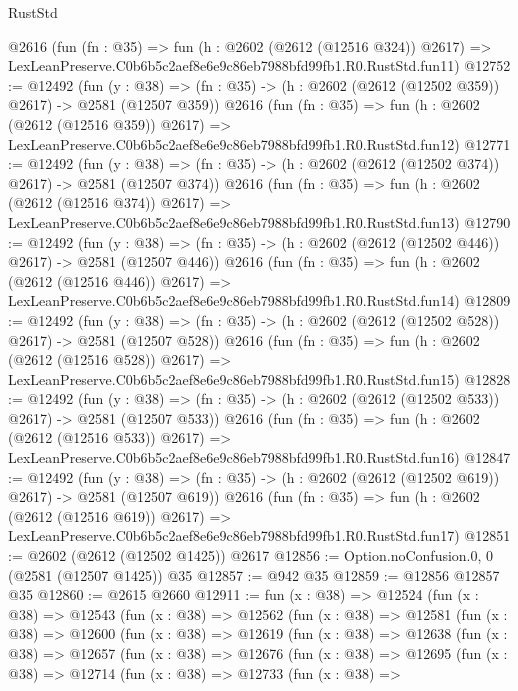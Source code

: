 \begin{lexlean}{RustStd}
\begin{coremodule}
    @2616
    (fun (fn : @35) =>
    fun (h : @2602 (@2612 (@12516 @324)) @2617) =>
    LexLeanPreserve.C0b6b5c2aef8e6e9c86eb7988bfd99fb1.R0.RustStd.fun11)
@12752 := @12492
    (fun (y : @38) => (fn : @35) -> (h : @2602 (@2612 (@12502 @359)) @2617) -> @2581 (@12507 @359))
    @2616
    (fun (fn : @35) =>
    fun (h : @2602 (@2612 (@12516 @359)) @2617) =>
    LexLeanPreserve.C0b6b5c2aef8e6e9c86eb7988bfd99fb1.R0.RustStd.fun12)
@12771 := @12492
    (fun (y : @38) => (fn : @35) -> (h : @2602 (@2612 (@12502 @374)) @2617) -> @2581 (@12507 @374))
    @2616
    (fun (fn : @35) =>
    fun (h : @2602 (@2612 (@12516 @374)) @2617) =>
    LexLeanPreserve.C0b6b5c2aef8e6e9c86eb7988bfd99fb1.R0.RustStd.fun13)
@12790 := @12492
    (fun (y : @38) => (fn : @35) -> (h : @2602 (@2612 (@12502 @446)) @2617) -> @2581 (@12507 @446))
    @2616
    (fun (fn : @35) =>
    fun (h : @2602 (@2612 (@12516 @446)) @2617) =>
    LexLeanPreserve.C0b6b5c2aef8e6e9c86eb7988bfd99fb1.R0.RustStd.fun14)
@12809 := @12492
    (fun (y : @38) => (fn : @35) -> (h : @2602 (@2612 (@12502 @528)) @2617) -> @2581 (@12507 @528))
    @2616
    (fun (fn : @35) =>
    fun (h : @2602 (@2612 (@12516 @528)) @2617) =>
    LexLeanPreserve.C0b6b5c2aef8e6e9c86eb7988bfd99fb1.R0.RustStd.fun15)
@12828 := @12492
    (fun (y : @38) => (fn : @35) -> (h : @2602 (@2612 (@12502 @533)) @2617) -> @2581 (@12507 @533))
    @2616
    (fun (fn : @35) =>
    fun (h : @2602 (@2612 (@12516 @533)) @2617) =>
    LexLeanPreserve.C0b6b5c2aef8e6e9c86eb7988bfd99fb1.R0.RustStd.fun16)
@12847 := @12492
    (fun (y : @38) => (fn : @35) -> (h : @2602 (@2612 (@12502 @619)) @2617) -> @2581 (@12507 @619))
    @2616
    (fun (fn : @35) =>
    fun (h : @2602 (@2612 (@12516 @619)) @2617) =>
    LexLeanPreserve.C0b6b5c2aef8e6e9c86eb7988bfd99fb1.R0.RustStd.fun17)
@12851 := @2602 (@2612 (@12502 @1425)) @2617
@12856 := Option.noConfusion.{0, 0} (@2581 (@12507 @1425)) @35
@12857 := @942 @35
@12859 := @12856 @12857 @35
@12860 := @2615 @2660
@12911 := fun (x : @38) =>
  @12524
    (fun (x : @38) =>
    @12543
      (fun (x : @38) =>
      @12562
        (fun (x : @38) =>
        @12581
          (fun (x : @38) =>
          @12600
            (fun (x : @38) =>
            @12619
              (fun (x : @38) =>
              @12638
                (fun (x : @38) =>
                @12657
                  (fun (x : @38) =>
                  @12676
                    (fun (x : @38) =>
                    @12695
                      (fun (x : @38) =>
                      @12714
                        (fun (x : @38) =>
                        @12733
                          (fun (x : @38) =>

\end{coremodule}
\end{lexlean}
